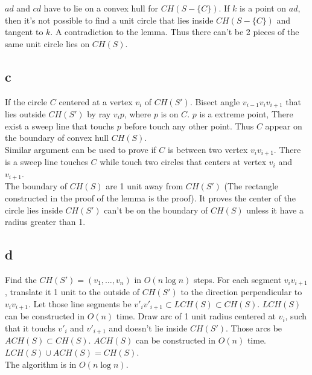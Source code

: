 \documentclass[letter]{article}
\begin{document}
$ad$ and $cd$ have to lie on a convex hull for $CH(S-\{C\})$. If $k$ is a point on $ad$, then it's not possible to find a unit circle that lies inside $CH(S-\{C\})$ and tangent to $k$. A contradiction to the lemma. Thus there can't be 2 pieces of the same unit circle lies on $CH(S)$. 

\subsection*{c}
If the circle $C$ centered at a vertex $v_i$ of $CH(S')$. Bisect angle $v_{i-1}v_iv_{i+1}$ that lies outside $CH(S')$ by ray $v_ip$, where $p$ is on $C$. $p$ is a extreme point, There exist a sweep line that touchs $p$ before touch any other point. Thus $C$ appear on the boundary of convex hull $CH(S)$.\\
Similar argument can be used to prove if $C$ is between two vertex $v_iv_{i+1}$. There is a sweep line touches $C$ while touch two circles that centers at vertex $v_i$ and $v_{i+1}$. \\
The boundary of $CH(S)$ are 1 unit away from $CH(S')$ (The rectangle constructed in the proof of the lemma is the proof). It proves the center of the circle lies inside $CH(S')$ can't be on the boundary of $CH(S)$ unless it have a radius greater than 1.

\subsection*{d}
Find the $CH(S') = (v_1,\ldots,v_n)$ in $O(n\log n)$ steps. For each segment $v_iv_{i+1}$, translate it 1 unit to the outside of $CH(S')$ to the direction perpendicular to $v_iv_{i+1}$. Let those line segments be $v'_iv'_{i+1} \subset LCH(S) \subset CH(S)$. $LCH(S)$ can be constructed in $O(n)$ time. Draw arc of 1 unit radius centered at $v_i$, such that it touchs $v'_i$ and $v'_{i+1}$ and doesn't lie inside $CH(S')$. Those arcs be $ACH(S) \subset CH(S)$. $ACH(S)$ can be constructed in $O(n)$ time. $LCH(S)\cup ACH(S) = CH(S)$.\\
The algorithm is in $O(n \log n)$.
\end{document}
